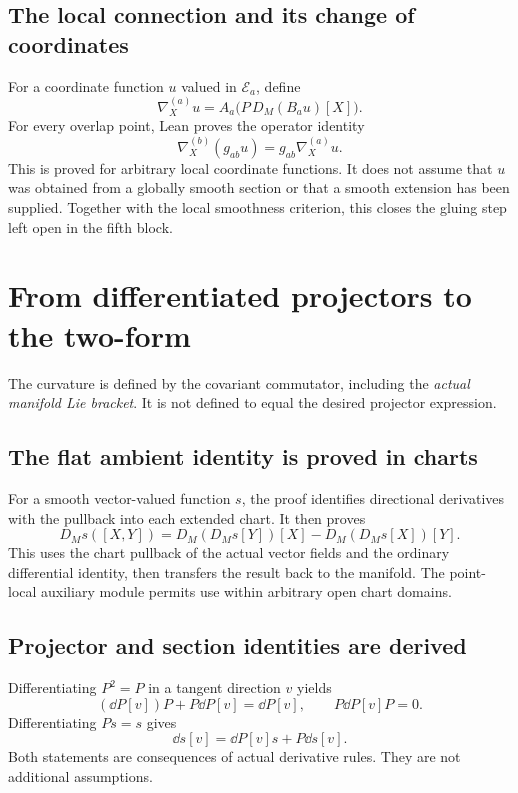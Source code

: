 \subsection{The local connection and its change of coordinates}
For a coordinate function $u$ valued in $\mathcal E_a$, define
\[
\nabla^{(a)}_Xu=A_a\bigl(P\,D_M(B_a u)[X]\bigr).
\]
For every overlap point, Lean proves the operator identity
\[
\boxed{\nabla^{(b)}_X(g_{ab}u)=g_{ab}\nabla^{(a)}_Xu.}
\]
This is proved for arbitrary local coordinate functions. It does not assume that $u$ was obtained from a globally smooth section or that a smooth extension has been supplied. Together with the local smoothness criterion, this closes the gluing step left open in the fifth block.





\section{From differentiated projectors to the two-form}\label{supp6:section:004}
The curvature is defined by the covariant commutator, including the \emph{actual manifold Lie bracket}. It is not defined to equal the desired projector expression.

\subsection{The flat ambient identity is proved in charts}
For a smooth vector-valued function $s$, the proof identifies directional derivatives with the pullback into each extended chart. It then proves
\[
D_Ms([X,Y])=D_M(D_Ms[Y])[X]-D_M(D_Ms[X])[Y].
\]
This uses the chart pullback of the actual vector fields and the ordinary differential identity, then transfers the result back to the manifold. The point-local auxiliary module permits use within arbitrary open chart domains.

\subsection{Projector and section identities are derived}
Differentiating $P^2=P$ in a tangent direction $v$ yields
\[
(\dd P[v])P+P\dd P[v]=\dd P[v],
\qquad P\dd P[v]P=0.
\]
Differentiating $Ps=s$ gives
\[
\dd s[v]=\dd P[v]s+P\dd s[v].
\]
Both statements are consequences of actual derivative rules. They are not additional assumptions.

